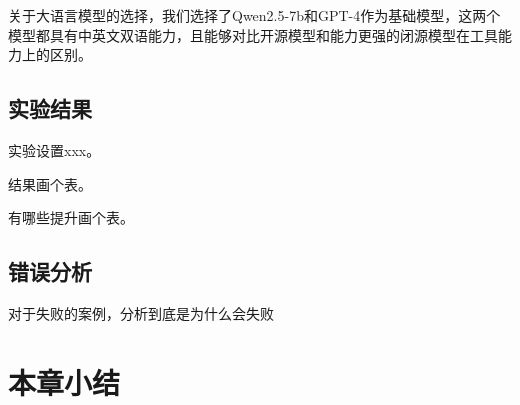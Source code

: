 关于大语言模型的选择，我们选择了Qwen2.5-7b和GPT-4作为基础模型，这两个模型都具有中英文双语能力，且能够对比开源模型和能力更强的闭源模型在工具能力上的区别。

\subsection{实验结果}

实验设置xxx。

结果画个表。

有哪些提升画个表。

\label{subsec:exp_results}

\subsection{错误分析}
\label{subsec:error_analysis}

对于失败的案例，分析到底是为什么会失败

\section{本章小结}
\label{sec:summary_chap4}